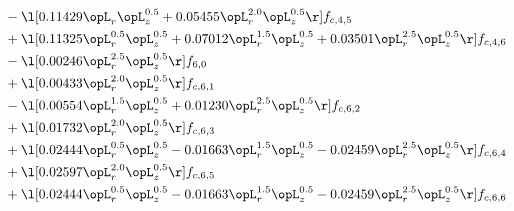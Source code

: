 \begin{alignat}{2}
& - \l[  0.11429 \opL_r \opL_z^{0.5} +  0.05455 \opL_r^{2.0} \opL_z^{0.5}  \r] f_{c,4,5} \nonumber \\ 
& + \l[  0.11325 \opL_r^{0.5} \opL_z^{0.5} +  0.07012 \opL_r^{1.5} \opL_z^{0.5} +  0.03501 \opL_r^{2.5} \opL_z^{0.5}  \r] f_{c,4,6} \nonumber \\ 
& - \l[  0.00246 \opL_r^{2.5} \opL_z^{0.5}  \r] f_{6,0} \nonumber \\ 
& + \l[  0.00433 \opL_r^{2.0} \opL_z^{0.5}  \r] f_{c,6,1} \nonumber \\ 
& - \l[  0.00554 \opL_r^{1.5} \opL_z^{0.5} +  0.01230 \opL_r^{2.5} \opL_z^{0.5}  \r] f_{c,6,2} \nonumber \\ 
& + \l[  0.01732 \opL_r^{2.0} \opL_z^{0.5}  \r] f_{c,6,3} \nonumber \\ 
& + \l[  0.02444 \opL_r^{0.5} \opL_z^{0.5}   -0.01663 \opL_r^{1.5} \opL_z^{0.5}   -0.02459 \opL_r^{2.5} \opL_z^{0.5}  \r] f_{c,6,4} \nonumber \\ 
& + \l[  0.02597 \opL_r^{2.0} \opL_z^{0.5}  \r] f_{c,6,5} \nonumber \\ 
& + \l[  0.02444 \opL_r^{0.5} \opL_z^{0.5}   -0.01663 \opL_r^{1.5} \opL_z^{0.5}   -0.02459 \opL_r^{2.5} \opL_z^{0.5}  \r] f_{c,6,6} \nonumber \\ 
\end{alignat} 


